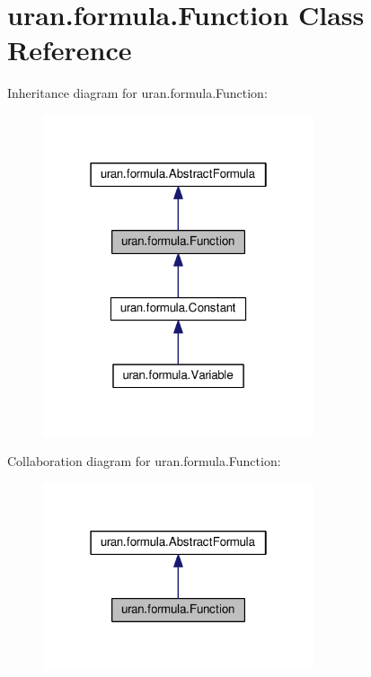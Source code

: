 \hypertarget{classuran_1_1formula_1_1_function}{}\section{uran.\+formula.\+Function Class Reference}
\label{classuran_1_1formula_1_1_function}


Inheritance diagram for uran.\+formula.\+Function\+:
\nopagebreak
\begin{figure}[H]
\begin{center}
\leavevmode
\includegraphics[width=226pt]{classuran_1_1formula_1_1_function__inherit__graph}
\end{center}
\end{figure}


Collaboration diagram for uran.\+formula.\+Function\+:
\nopagebreak
\begin{figure}[H]
\begin{center}
\leavevmode
\includegraphics[width=226pt]{classuran_1_1formula_1_1_function__coll__graph}
\end{center}
\end{figure}
